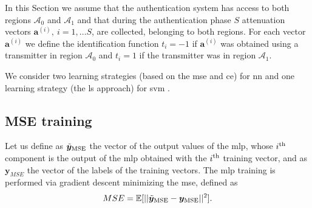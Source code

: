 \documentclass[draftcls,onecolumn,12pt]{IEEEtran}
\newcommand{\ai}{\mathbf{a}^{(i)}}
\begin{document}
In this Section we assume that the authentication system has access to both regions $\mathcal{A}_0$ and $\mathcal{A}_1$ and that during the authentication phase $S$ attenuation vectors $\ai, \ i=1,\dots S$, are collected, belonging to both regions. For each vector $\ai$ we define the identification function $t_i = -1$ if $\ai$ was obtained using a transmitter in region $\mathcal{A}_0$ and $t_i = 1$ if the transmitter was in region $\mathcal{A}_1$.

We consider two learning strategies (based on the \ac{mse} and \ac{ce}) for \ac{nn} \cite{Bishop2006} and one learning strategy (the \ac{ls} approach) for \ac{svm} \cite{Suykens1999}.


\subsection{ MSE training}
Let us define as $\tilde{\bm{y}}_{\rm MSE}$ the vector of the output values of the \ac{mlp}, whose $i^{\rm th}$ component is the output of the \ac{mlp} obtained with the $i^{\rm th}$ training vector, and as $\bm{y}_{MSE}$ the vector of the labels of the training vectors. The \ac{mlp} training is performed via gradient descent minimizing the \ac{mse}, defined as
\begin{equation}
MSE = \mathbb{E}[||\tilde{\bm{y}}_{\rm MSE}-\bm{y}_{\rm MSE}||^2].
\end{equation}
\end{document}
